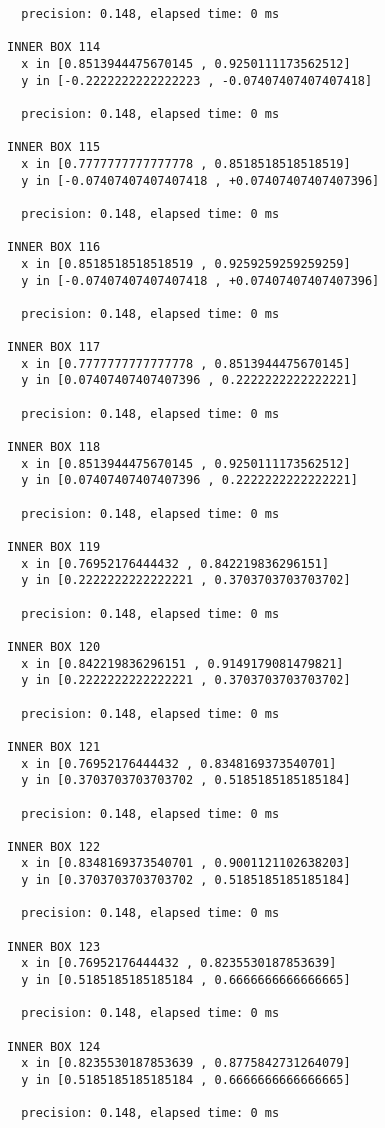 \begin{verbatim}
  precision: 0.148, elapsed time: 0 ms

INNER BOX 114
  x in [0.8513944475670145 , 0.9250111173562512]
  y in [-0.2222222222222223 , -0.07407407407407418]

  precision: 0.148, elapsed time: 0 ms

INNER BOX 115
  x in [0.7777777777777778 , 0.8518518518518519]
  y in [-0.07407407407407418 , +0.07407407407407396]

  precision: 0.148, elapsed time: 0 ms

INNER BOX 116
  x in [0.8518518518518519 , 0.9259259259259259]
  y in [-0.07407407407407418 , +0.07407407407407396]

  precision: 0.148, elapsed time: 0 ms

INNER BOX 117
  x in [0.7777777777777778 , 0.8513944475670145]
  y in [0.07407407407407396 , 0.2222222222222221]

  precision: 0.148, elapsed time: 0 ms

INNER BOX 118
  x in [0.8513944475670145 , 0.9250111173562512]
  y in [0.07407407407407396 , 0.2222222222222221]

  precision: 0.148, elapsed time: 0 ms

INNER BOX 119
  x in [0.76952176444432 , 0.842219836296151]
  y in [0.2222222222222221 , 0.3703703703703702]

  precision: 0.148, elapsed time: 0 ms

INNER BOX 120
  x in [0.842219836296151 , 0.9149179081479821]
  y in [0.2222222222222221 , 0.3703703703703702]

  precision: 0.148, elapsed time: 0 ms

INNER BOX 121
  x in [0.76952176444432 , 0.8348169373540701]
  y in [0.3703703703703702 , 0.5185185185185184]

  precision: 0.148, elapsed time: 0 ms

INNER BOX 122
  x in [0.8348169373540701 , 0.9001121102638203]
  y in [0.3703703703703702 , 0.5185185185185184]

  precision: 0.148, elapsed time: 0 ms

INNER BOX 123
  x in [0.76952176444432 , 0.8235530187853639]
  y in [0.5185185185185184 , 0.6666666666666665]

  precision: 0.148, elapsed time: 0 ms

INNER BOX 124
  x in [0.8235530187853639 , 0.8775842731264079]
  y in [0.5185185185185184 , 0.6666666666666665]

  precision: 0.148, elapsed time: 0 ms


\end{verbatim}
